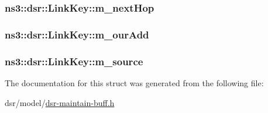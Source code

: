 \subsubsection[{\texorpdfstring{m\+\_\+next\+Hop}{m_nextHop}}]{ ns3\+::dsr\+::\+Link\+Key\+::m\+\_\+next\+Hop}\hypertarget{structns3_1_1dsr_1_1LinkKey_afd2217721c7442503ebf6d708c1ca00a}{}\label{structns3_1_1dsr_1_1LinkKey_afd2217721c7442503ebf6d708c1ca00a}
\subsubsection[{\texorpdfstring{m\+\_\+our\+Add}{m_ourAdd}}]{ ns3\+::dsr\+::\+Link\+Key\+::m\+\_\+our\+Add}\hypertarget{structns3_1_1dsr_1_1LinkKey_a7d986790dade52e799e34ba79af2aa96}{}\label{structns3_1_1dsr_1_1LinkKey_a7d986790dade52e799e34ba79af2aa96}
\subsubsection[{\texorpdfstring{m\+\_\+source}{m_source}}]{ ns3\+::dsr\+::\+Link\+Key\+::m\+\_\+source}\hypertarget{structns3_1_1dsr_1_1LinkKey_a522ac967540e9db2425ca20c43e30f45}{}\label{structns3_1_1dsr_1_1LinkKey_a522ac967540e9db2425ca20c43e30f45}


The documentation for this struct was generated from the following file\+:\begin{DoxyCompactItemize}
\item 
dsr/model/\hyperlink{dsr-maintain-buff_8h}{dsr-\/maintain-\/buff.\+h}\end{DoxyCompactItemize}
